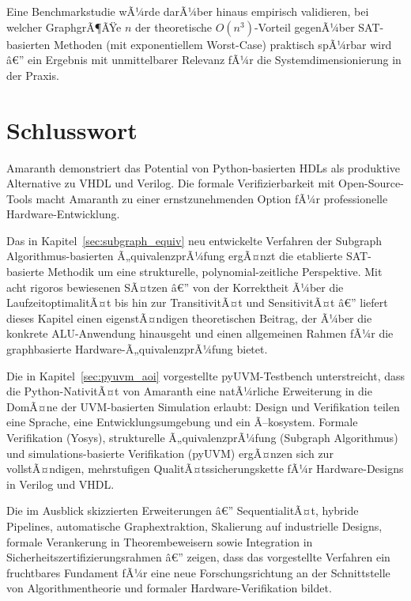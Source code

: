﻿\documentclass[12pt,a4paper]{report}
\begin{document}
Eine Benchmarkstudie wÃ¼rde darÃ¼ber hinaus empirisch validieren, bei welcher GraphgrÃ¶ÃŸe
$n$ der theoretische $O(n^3)$-Vorteil gegenÃ¼ber SAT-basierten Methoden (mit exponentiellem
Worst-Case) praktisch spÃ¼rbar wird â€” ein Ergebnis mit unmittelbarer
Relevanz fÃ¼r die Systemdimensionierung in der Praxis.

\section{Schlusswort}

Amaranth demonstriert das Potential von Python-basierten HDLs als produktive Alternative
zu VHDL und Verilog. Die formale Verifizierbarkeit mit Open-Source-Tools macht Amaranth
zu einer ernstzunehmenden Option fÃ¼r professionelle Hardware-Entwicklung.

Das in Kapitel~\ref{sec:subgraph_equiv} neu entwickelte Verfahren der
Subgraph Algorithmus-basierten Ã„quivalenzprÃ¼fung ergÃ¤nzt die etablierte SAT-basierte
Methodik um eine strukturelle, polynomial-zeitliche Perspektive. Mit acht rigoros
bewiesenen SÃ¤tzen â€” von der Korrektheit Ã¼ber die LaufzeitoptimalitÃ¤t bis hin zur
TransitivitÃ¤t und SensitivitÃ¤t â€” liefert dieses Kapitel einen eigenstÃ¤ndigen
theoretischen Beitrag, der Ã¼ber die konkrete ALU-Anwendung hinausgeht und einen
allgemeinen Rahmen fÃ¼r die graphbasierte Hardware-Ã„quivalenzprÃ¼fung bietet.

Die in Kapitel~\ref{sec:pyuvm_aoi} vorgestellte pyUVM-Testbench unterstreicht, dass
die Python-NativitÃ¤t von Amaranth eine natÃ¼rliche Erweiterung in die DomÃ¤ne der
UVM-basierten Simulation erlaubt: Design und Verifikation teilen eine Sprache, eine
Entwicklungsumgebung und ein Ã–kosystem. Formale Verifikation (Yosys), strukturelle
Ã„quivalenzprÃ¼fung (Subgraph Algorithmus) und simulations-basierte Verifikation (pyUVM)
ergÃ¤nzen sich zur vollstÃ¤ndigen, mehrstufigen QualitÃ¤tssicherungskette fÃ¼r
Hardware-Designs in Verilog und VHDL.

Die im Ausblick skizzierten Erweiterungen â€” SequentialitÃ¤t, hybride Pipelines,
automatische Graphextraktion, Skalierung auf industrielle Designs, formale Verankerung
in Theorembeweisern sowie Integration in Sicherheitszertifizierungsrahmen â€” zeigen,
dass das vorgestellte Verfahren ein fruchtbares Fundament fÃ¼r eine neue Forschungsrichtung
an der Schnittstelle von Algorithmentheorie und formaler Hardware-Verifikation bildet.
\end{document}

